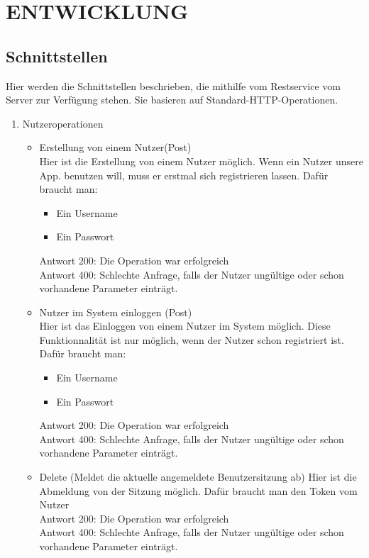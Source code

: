 \section{\uppercase{Entwicklung}}
\subsection{Schnittstellen}
Hier werden die Schnittstellen beschrieben, die mithilfe vom Restservice vom Server zur Verf\"ugung stehen. Sie basieren auf Standard-HTTP-Operationen.
\begin{enumerate}
\item Nutzeroperationen
\begin{itemize}
\item Erstellung von einem Nutzer(Post) \\
Hier ist die Erstellung von einem Nutzer m\"oglich. Wenn ein Nutzer unsere App. benutzen will, muss er erstmal sich registrieren lassen. Daf\"ur braucht man: 
\begin{itemize}
\item Ein Username 
\item Ein Passwort 
\end{itemize}
Antwort 200: Die Operation war erfolgreich\\ 
Antwort 400: Schlechte Anfrage, falls der Nutzer ung\"ultige oder schon vorhandene Parameter eintr\"agt. 

\item Nutzer im System einloggen (Post) \\
Hier ist das Einloggen von einem Nutzer im System m\"oglich. Diese Funktionnalit\"at ist nur m\"oglich, wenn der Nutzer schon registriert ist. Daf\"ur braucht man: 
\begin{itemize}
\item Ein Username 
\item Ein Passwort 
\end{itemize}
Antwort 200: Die Operation war erfolgreich \\ 
Antwort 400: Schlechte Anfrage, falls der Nutzer ung\"ultige oder schon vorhandene Parameter eintr\"agt. 
\item Delete (Meldet die aktuelle angemeldete Benutzersitzung ab)
Hier ist die Abmeldung von der Sitzung m\"oglich. Daf\"ur braucht man den Token vom Nutzer \\
Antwort 200: Die Operation war erfolgreich \\ 
Antwort 400: Schlechte Anfrage, falls der Nutzer ung\"ultige oder schon vorhandene Parameter eintr\"agt. 
\end{itemize}


\end{enumerate}
